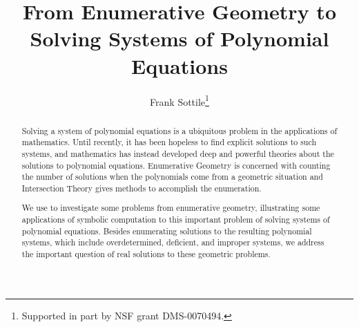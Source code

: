 %
%
%
%

\title{From Enumerative Geometry to Solving Systems of Polynomial Equations}

\author{Frank Sottile\thanks{Supported in part by NSF grant DMS-0070494.}}
\maketitle

\begin{abstract}
Solving a system of polynomial equations is a ubiquitous problem in
the applications of mathematics. 
Until recently, it has been hopeless to find explicit solutions to such
systems, and mathematics has instead developed deep and
powerful theories about the solutions to polynomial equations.
Enumerative Geometry is concerned with counting the
number of solutions when the polynomials come from a geometric situation and
Intersection Theory gives methods to accomplish the enumeration.

   We use \Mtwo{}\/ to investigate some problems from enumerative geometry,
illustrating some applications of symbolic computation to this important
problem of solving systems of polynomial equations.
Besides enumerating solutions to the resulting polynomial systems, which
include overdetermined, deficient, and improper systems, we address the
important question of real solutions to these geometric problems. 
\end{abstract}

